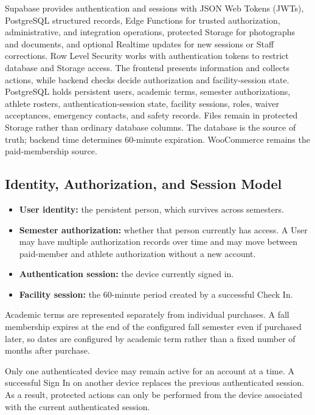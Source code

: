 \documentclass[11pt,letterpaper]{article}
\begin{document}
Supabase provides authentication and sessions with JSON Web Tokens (JWTs), PostgreSQL structured records, Edge Functions for trusted authorization, administrative, and integration operations, protected Storage for photographs and documents, and optional Realtime updates for new sessions or Staff corrections. Row Level Security works with authentication tokens to restrict database and Storage access. The frontend presents information and collects actions, while backend checks decide authorization and facility-session state. PostgreSQL holds persistent users, academic terms, semester authorizations, athlete rosters, authentication-session state, facility sessions, roles, waiver acceptances, emergency contacts, and safety records. Files remain in protected Storage rather than ordinary database columns. The database is the source of truth; backend time determines 60-minute expiration. WooCommerce remains the paid-membership source.

\subsection{Identity, Authorization, and Session Model}

\begin{itemize}
  \item \textbf{User identity:} the persistent person, which survives across semesters.
  \item \textbf{Semester authorization:} whether that person currently has access. A User may have multiple authorization records over time and may move between paid-member and athlete authorization without a new account.
  \item \textbf{Authentication session:} the device currently signed in.
  \item \textbf{Facility session:} the 60-minute period created by a successful Check In.
\end{itemize}

Academic terms are represented separately from individual purchases. A fall membership expires at the end of the configured fall semester even if purchased later, so dates are configured by academic term rather than a fixed number of months after purchase.

Only one authenticated device may remain active for an account at a time. A successful Sign In on another device replaces the previous authenticated session. As a result, protected actions can only be performed from the device associated with the current authenticated session.
\end{document}
